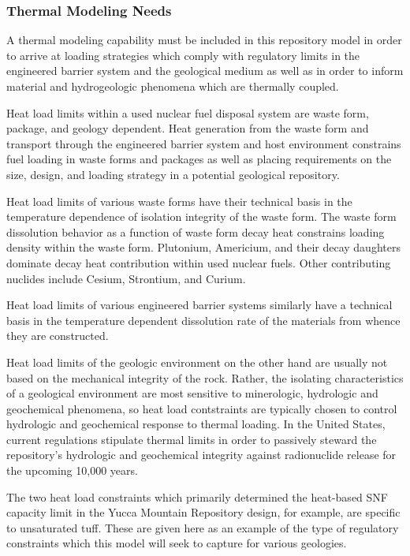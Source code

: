 \subsubsection{Thermal Modeling Needs}
A thermal modeling capability must be included in this repository 
model in order to arrive at loading strategies which comply with 
regulatory limits in the engineered barrier system and the geological 
medium as well as in order to inform material and hydrogeologic 
phenomena which are thermally coupled. 

Heat load limits within a used nuclear fuel disposal system are waste 
form, package, and geology dependent. Heat generation from the waste form 
and transport through the engineered barrier system and host 
environment constrains fuel loading in waste forms and packages as 
well as placing requirements on the size, design, and loading strategy 
in a potential geological repository.

Heat load limits of various waste forms have their technical basis in 
the temperature dependence of isolation integrity of the waste form.  
The waste form dissolution behavior as a function of waste form decay heat 
constrains loading density within the waste form. Plutonium, Americium, and 
their decay daughters dominate decay heat contribution within used nuclear 
fuels. Other contributing nuclides include Cesium, Strontium, and Curium. 
\cite{piet_which_2007} 
 
Heat load limits of various engineered barrier systems similarly have 
a technical basis in the temperature dependent dissolution rate of the 
materials from whence they are constructed.  

Heat load limits of the geologic environment on the other hand are 
usually not based on the mechanical integrity of the rock.  Rather, 
the isolating characteristics of a geological environment are most 
sensitive to minerologic, hydrologic and geochemical phenomena, so heat load 
contstraints are typically chosen to control hydrologic and 
geochemical response to thermal loading. In the United States, current 
regulations stipulate thermal limits in order to passively steward the 
repository's hydrologic and geochemical integrity against radionuclide  
release for the upcoming 10,000 years.

The two heat load constraints which primarily determined the 
heat-based SNF capacity limit in the Yucca Mountain Repository design, 
for example, are specific to unsaturated tuff. These are given here as an 
example of the type of regulatory constraints which this model will seek to 
capture for various geologies. 


